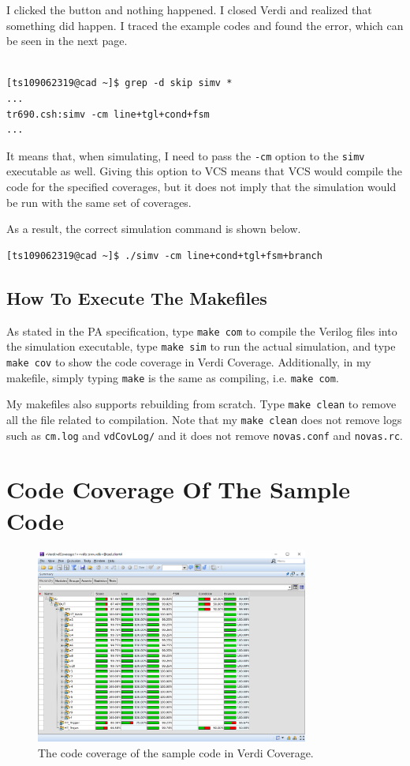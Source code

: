 \documentclass{article}
\begin{document}
I clicked the button and nothing happened. I closed Verdi and realized that something did happen. I traced the example codes and found the error, which can be seen in the next page.

\begin{verbatim}

[ts109062319@cad ~]$ grep -d skip simv *
...
tr690.csh:simv -cm line+tgl+cond+fsm
...
\end{verbatim}

It means that, when simulating, I need to pass the \verb|-cm| option to the \verb|simv| executable as well. Giving this option to VCS means that VCS would compile the code for the specified coverages, but it does not imply that the simulation would be run with the same set of coverages.

As a result, the correct simulation command is shown below.

\begin{verbatim}
[ts109062319@cad ~]$ ./simv -cm line+cond+tgl+fsm+branch
\end{verbatim}

\subsection{How To Execute The Makefiles \cite{gnumake}}

As stated in the PA specification, type \verb|make com| to compile the Verilog files into the simulation executable, type \verb|make sim| to run the actual simulation, and type \verb|make cov| to show the code coverage in Verdi Coverage. Additionally, in my makefile, simply typing \verb|make| is the same as compiling, i.e. \verb|make com|.

My makefiles also supports rebuilding from scratch. Type \verb|make clean| to remove all the file related to compilation. Note that my \verb|make clean| does not remove logs such as \verb|cm.log| and \verb|vdCovLog/| and it does not remove \verb|novas.conf| and \verb|novas.rc|.

\section{Code Coverage Of The Sample Code}

\begin{figure}[h] \centering
\includegraphics[width=0.8\textwidth]{HT}
\caption{The code coverage of the sample code in Verdi Coverage.}
\label{HT}
\end{figure}
\end{document}
